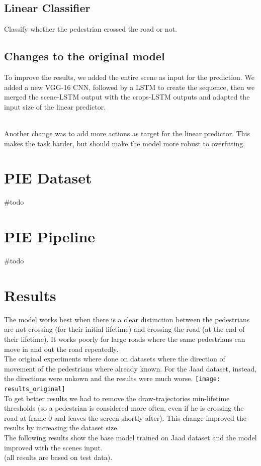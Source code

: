 \documentclass[11pt]{article}
\begin{document}
\subsection*{Linear Classifier}
Classify whether the pedestrian crossed the road or not.

\subsection*{Changes to the original model}
To improve the results, we added the entire scene as input for the prediction.
We added a new VGG-16 CNN, followed by a LSTM to create the sequence, then we merged the scene-LSTM output with the crops-LSTM
outputs and adapted the input size of the linear predictor.

\\
Another change was to add more actions as target for the linear predictor.
This makes the task harder, but should make the model more robust to overfitting.


\section{PIE Dataset}
\#todo

\section{PIE Pipeline}
\#todo


\section{Results}
    The model works best when there is a clear distinction between the pedestrians are not-crossing (for their initial lifetime)
    and crossing the road (at the end of their lifetime).
    It works poorly for large roads where the same pedestrians can move in and out the road repeatedly.\\
    The original experiments where done on datasets where the direction of movement of the pedestrians where already known.
    For the Jaad dataset, instead, the directions were unkown and the results were much worse.
    \texttt{[image: results\_original]}\\
    To get better results we had to remove the draw-trajectories min-lifetime thresholds (so a pedestrian is considered more often, even if he
    is crossing the road at frame 0 and leaves the screen shortly after).
    This change improved the results by increasing the dataset size.\\
    The following results show the base model trained on Jaad dataset and the model improved with the scenes input.\\
    (all results are based on test data).
\end{document}
